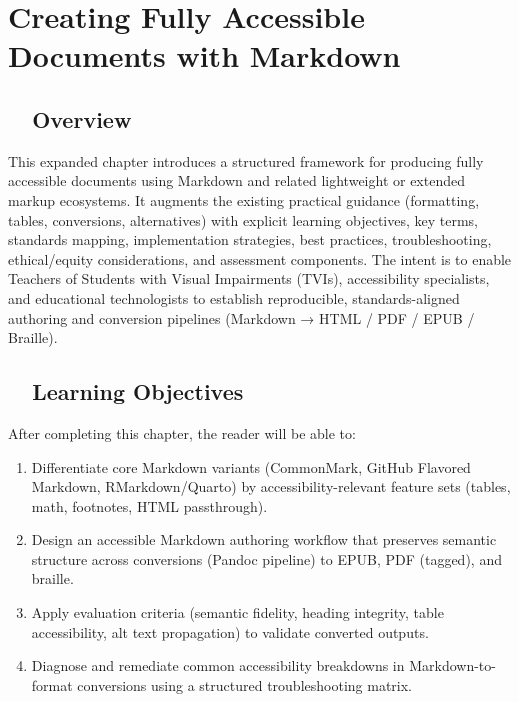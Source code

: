 \chapter{Creating Fully Accessible Documents with Markdown}

\section{~~Overview}\label{ch19:sec:overview}
This expanded chapter introduces a structured framework for producing fully accessible documents using Markdown and related lightweight or extended markup ecosystems. It augments the existing practical guidance (formatting, tables, conversions, alternatives) with explicit learning objectives, key terms, standards mapping, implementation strategies, best practices, troubleshooting, ethical/equity considerations, and assessment components. The intent is to enable Teachers of Students with Visual Impairments (TVIs), accessibility specialists, and educational technologists to establish reproducible, standards-aligned authoring and conversion pipelines (Markdown → HTML / PDF / EPUB / Braille).

\section{~~Learning Objectives}\label{ch19:sec:learning-objectives}
After completing this chapter, the reader will be able to:
\begin{enumerate}
	\item Differentiate core Markdown variants (CommonMark, GitHub Flavored Markdown, RMarkdown/Quarto) by accessibility-relevant feature sets (tables, math, footnotes, HTML passthrough).
	\item Design an accessible Markdown authoring workflow that preserves semantic structure across conversions (Pandoc pipeline) to EPUB, PDF (tagged), and braille.
	\item Apply evaluation criteria (semantic fidelity, heading integrity, table accessibility, alt text propagation) to validate converted outputs.
	\item Diagnose and remediate common accessibility breakdowns in Markdown-to-format conversions using a structured troubleshooting matrix.
\end{enumerate}

